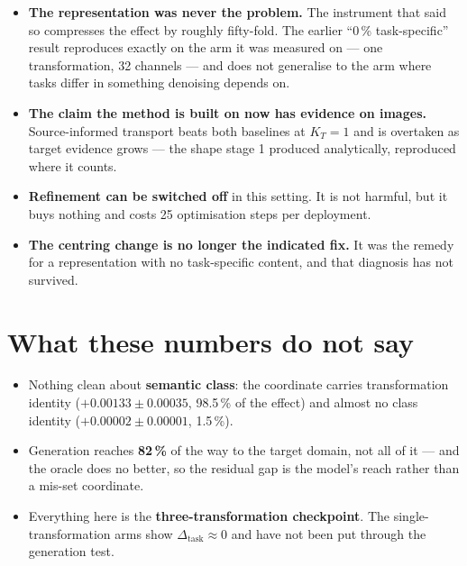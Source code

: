 \documentclass[11pt]{article}
\newcommand{\KT}{K_{T}}
\newcommand{\dtask}{\Delta_{\mathrm{task}}}
\begin{document}
\begin{itemize}
  \item \textbf{The representation was never the problem.} The instrument that said so
    compresses the effect by roughly fifty-fold. The earlier ``0\,\% task-specific''
    result reproduces exactly on the arm it was measured on --- one transformation, 32
    channels --- and does not generalise to the arm where tasks differ in something
    denoising depends on.
  \item \textbf{The claim the method is built on now has evidence on images.}
    Source-informed transport beats both baselines at $\KT = 1$ and is overtaken as target
    evidence grows --- the shape stage 1 produced analytically, reproduced where it counts.
  \item \textbf{Refinement can be switched off} in this setting. It is not harmful, but it
    buys nothing and costs 25 optimisation steps per deployment.
  \item \textbf{The centring change is no longer the indicated fix.} It was the remedy
    for a representation with no task-specific content, and that diagnosis has not
    survived.
\end{itemize}

\section*{What these numbers do not say}

\begin{itemize}
  \item Nothing clean about \textbf{semantic class}: the coordinate carries
    transformation identity ($+0.00133 \pm 0.00035$, 98.5\,\% of the effect) and almost
    no class identity ($+0.00002 \pm 0.00001$, 1.5\,\%).
  \item Generation reaches \textbf{82\,\%} of the way to the target domain, not all of
    it --- and the oracle does no better, so the residual gap is the model's reach rather
    than a mis-set coordinate.
  \item Everything here is the \textbf{three-transformation checkpoint}. The
    single-transformation arms show $\dtask \approx 0$ and have not been put through the
    generation test.
\end{itemize}

\vfill
{}
\end{document}
